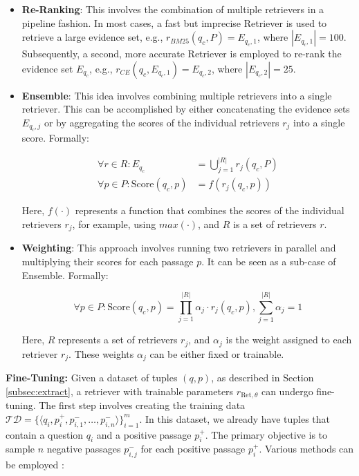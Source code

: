 \begin{itemize}
    \item \textbf{Re-Ranking}: This involves the combination of multiple retrievers in a pipeline fashion. In most cases, a fast but imprecise Retriever is used to retrieve a large evidence set, e.g., $r_{BM25}(q_c,P) = E_{q_c,1}$, where $|E_{q_c,1}| = 100$. Subsequently, a second, more accurate Retriever is employed to re-rank the evidence set $E_{q_c}$, e.g., $r_{CE}(q_c,E_{q_c,1}) = E_{q_c,2}$, where $|E_{q_c,2}| = 25$.
    
    \item \textbf{Ensemble}: This idea involves combining multiple retrievers into a single retriever. This can be accomplished by either concatenating the evidence sets $E_{q_c,j}$ or by aggregating the scores of the individual retrievers $r_j$ into a single score. Formally:
    
    \begin{align}
        \forall r \in R: E_{q_c} &= \bigcup_{j=1}^{|R|} r_j(q_c, P) \\
        \forall p \in P: \text{Score}(q_c, p) &= f(r_j(q_c, p))
    \end{align}
    
    Here, $f(\cdot)$ represents a function that combines the scores of the individual retrievers $r_j$, for example, using $max(\cdot)$, and $R$ is a set of retrievers $r$.
    
    \item \textbf{Weighting}: This approach involves running two retrievers in parallel and multiplying their scores for each passage $p$. It can be seen as a sub-case of Ensemble. Formally:
    
    \begin{equation}
        \forall p \in P: \text{Score}(q_c, p) = \prod_{j=1}^{|R|} \alpha_j \cdot r_j(q_c, p), \sum_{j=1}^{|R|} \alpha_j = 1
    \end{equation}
    
    Here, $R$ represents a set of retrievers $r_j$, and $\alpha_j$ is the weight assigned to each retriever $r_j$. These weights $\alpha_j$ can be either fixed or trainable.
\end{itemize}

\vspace{\baselineskip}

\textbf{Fine-Tuning:} Given a dataset of tuples $(q, p)$, as described in Section \ref{subsec:extract}, a retriever with trainable parameters $r_{\text{Ret}, \theta}$ can undergo fine-tuning. The first step involves creating the training data $\mathcal{TD} = \{\langle q_i, p_i^+, p_{i,1}^-, \dots, p_{i,n}^-\rangle\}_{i=1}^m$. In this dataset, we already have tuples that contain a question $q_i$ and a positive passage $p_i^+$. The primary objective is to sample $n$ negative passages $p_{i,j}^-$ for each positive passage $p_i^+$. Various methods can be employed \cite{karpukhin_dense_2020}:

